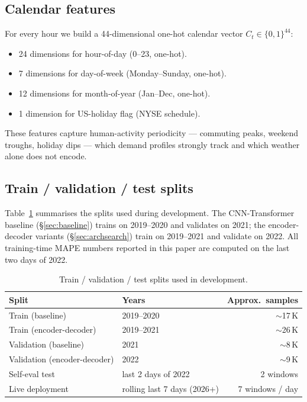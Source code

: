 \subsection{Calendar features}
\label{sec:data:cal}

For every hour we build a 44-dimensional one-hot calendar vector $C_t\in\{0,1\}^{44}$:
\begin{itemize}\setlength\itemsep{1pt}
  \item 24 dimensions for hour-of-day (0--23, one-hot).
  \item \phantom{0}7 dimensions for day-of-week (Monday--Sunday, one-hot).
  \item 12 dimensions for month-of-year (Jan--Dec, one-hot).
  \item \phantom{0}1 dimension for US-holiday flag (NYSE schedule).
\end{itemize}
These features capture human-activity periodicity --- commuting peaks, weekend troughs, holiday dips --- which demand profiles strongly track and which weather alone does not encode.

\subsection{Train / validation / test splits}
\label{sec:data:splits}

Table~\ref{tab:splits} summarises the splits used during development. The CNN-Transformer baseline (\S\ref{sec:baseline}) trains on 2019--2020 and validates on 2021; the encoder-decoder variants (\S\ref{sec:archsearch}) train on 2019--2021 and validate on 2022. All training-time MAPE numbers reported in this paper are computed on the last two days of 2022.

\begin{table}[!h]
\centering
\small
\caption{Train / validation / test splits used in development.}
\label{tab:splits}
\begin{tabular}{@{}llr@{}}
\toprule
Split & Years & Approx.\ samples \\
\midrule
Train (baseline)             & 2019--2020              & $\sim$17\,K \\
Train (encoder-decoder)      & 2019--2021              & $\sim$26\,K \\
Validation (baseline)        & 2021                    & $\sim$8\,K  \\
Validation (encoder-decoder) & 2022                    & $\sim$9\,K  \\
Self-eval test               & last 2 days of 2022     & 2 windows   \\
Live deployment              & rolling last 7 days (2026+) & 7 windows / day \\
\bottomrule
\end{tabular}
\end{table}

